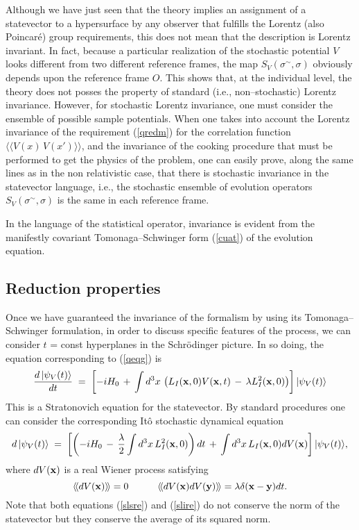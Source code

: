 \documentclass[12pt]{article}
\newcommand{\llangle}{\langle\!\langle}
\newcommand{\rrangle}{\rangle\!\rangle}
\begin{document}
Although we have just seen that the theory implies an assignment
of a statevector to a hypersurface by any observer that fulfills
the Lorentz (also Poincar\'e) group requirements, this does not
mean that the description is Lorentz invariant. In fact, because a
particular realization of the stochastic potential $V$ looks
different from two different reference frames, the map
$S_{V}(\sigma{}^{\sim}, \sigma)$ obviously depends upon the
reference frame $O$. This shows that, at the individual level, the
theory does not posses the property of standard (i.e.,
non--stochastic) Lorentz invariance. However, for stochastic
Lorentz invariance, one must consider the ensemble of possible
sample potentials. When one takes into account the Lorentz
invariance of the requirement (\ref{qredm}) for the correlation
function $\llangle V(x)\, V(x') \rrangle$, and the invariance of
the cooking procedure that must be performed to get the physics of
the problem, one can easily prove, along the same lines as in the
non relativistic case, that there is stochastic invariance in the
statevector language, i.e., the stochastic ensemble of evolution
operators $S_{V}(\sigma{}^{\sim}, \sigma)$ is the same in each
reference frame.

In the language of the statistical operator, invariance is evident
from the manifestly covariant Tomonaga--Schwinger form
(\ref{cuat}) of the evolution equation.

\subsection{Reduction properties} \label{sec95}

Once we have guaranteed the invariance of the formalism by using
its Tomonaga--Schwinger formulation, in order to discuss specific
features of the process, we can consider $t$ = const hyperplanes
in the Schr\"odinger picture. In so doing, the equation
corresponding to (\ref{qeqg}) is
\begin{equation} \label{slsre}
\frac{d\,|\psi_{V}(t)\rangle}{dt}\; = \; \left[ -i H_{0}\, + \,
\int d^{3}x\, \left( L_{I}({\bf x}, 0) V({\bf x}, t) \, - \,
\lambda L_{I}^{2}({\bf x}, 0) \right)\right] |\psi_{V}(t)\rangle
\end{equation}
This is a Stratonovich equation for the statevector. By standard
procedures one can consider the corresponding It\^o stochastic
dynamical equation
\begin{equation} \label{slire}
d\,|\psi_{V}(t)\rangle\; = \; \left[\left( -i H_{0}\, - \,
\frac{\lambda}{2}\int d^{3}x\, L_{I}^{2}({\bf x}, 0) \right) dt \,
+ \, \int d^{3}x\, L_{I}({\bf x}, 0) dV({\bf x}) \right]
|\psi_{V}(t)\rangle,
\end{equation}
where $dV({\bf x})$ is a real Wiener process satisfying
\begin{equation}
\llangle dV({\bf x}) \rrangle = 0 \qquad\quad \llangle dV({\bf x})
dV({\bf y}) \rrangle = \lambda \delta({\bf x} - {\bf y}) dt.
\end{equation}
Note that both equations (\ref{slsre}) and (\ref{slire}) do not
conserve the norm of the statevector but they conserve the average
of its squared norm.
\end{document}
